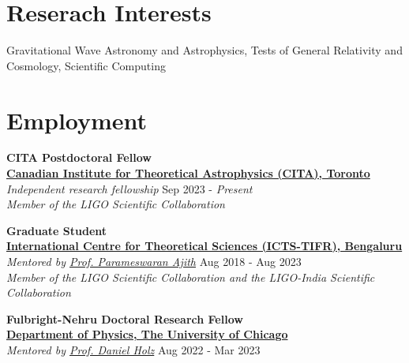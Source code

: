 \documentclass[11pt, margin, centered, letterpaper]{res}
\begin{document}
	\begin{resume}
		
		\section{Reserach Interests}
		Gravitational Wave Astronomy and Astrophysics, Tests of General Relativity and Cosmology, Scientific Computing 
		\\
		
		\section{Employment}
		\textbf{CITA Postdoctoral Fellow}
		\\
		\textbf{\href{https://www.icts.res.in/}{Canadian Institute for Theoretical Astrophysics (CITA), Toronto}}\\
		\emph{Independent research fellowship} \hfill Sep 2023 - \textit{Present}\\
		\textit{Member of the LIGO Scientific Collaboration}
		
		\textbf{Graduate Student}
		\\
		\textbf{\href{https://www.icts.res.in/}{International Centre for Theoretical Sciences (ICTS-TIFR), Bengaluru}}\\
		\emph{Mentored by \href{https://home.icts.res.in/~ajith/Home.html}{Prof. Parameswaran Ajith}} \hfill Aug 2018 - Aug 2023\\
		\textit{Member of the LIGO Scientific Collaboration and the LIGO-India Scientific Collaboration}
		
		\textbf{Fulbright-Nehru Doctoral Research Fellow}
		\\
		\textbf{\href{https://www.icts.res.in/}{Department of Physics, The University of Chicago}}\\
		\emph{Mentored by \href{https://home.icts.res.in/~ajith/Home.html}{Prof. Daniel Holz}} \hfill Aug 2022 - Mar 2023
		
		

\end{resume}
\end{document}
